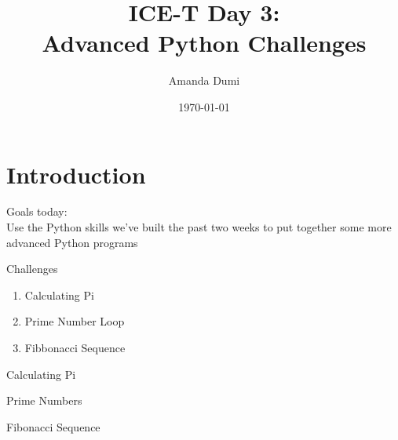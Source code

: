 \documentclass[xcolor=x11names,compress]{beamer}
\title[{\makebox[.5\paperwidth]{General Chemistry Recitation 1\hfill
       \insertframenumber/\inserttotalframenumber}}]{ICE-T Day 3:\\
Advanced Python Challenges}
\author[\quad Amanda \quad\quad\quad\quad aed63@pitt.edu]{Amanda Dumi\\}
\date{\small{\today}}
\renewcommand{\(}{\begin{columns}}
\renewcommand{\)}{\end{columns}}
\newcommand{\<}[1]{\begin{column}{#1}}
\renewcommand{\>}{\end{column}}
\begin{document}
\section{Introduction}
\begin{frame}
\titlepage
\end{frame}
\begin{frame}
Goals today:\\
Use the Python skills we've built the past two weeks to put together some more advanced Python programs
\end{frame}
\begin{frame}{Challenges}
\begin{enumerate}[label=$\bullet$]
    \item Calculating Pi
    \item Prime Number Loop
    \item Fibbonacci Sequence
\end{enumerate}
\end{frame}
\begin{frame}{Calculating Pi}

\end{frame}
\begin{frame}{Prime Numbers}

\end{frame}
\begin{frame}{Fibonacci Sequence}

\end{frame}
\end{document}

